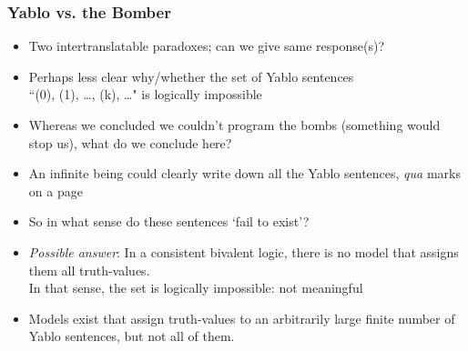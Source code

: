 \begin{frame}
\frametitle{Yablo vs. the Bomber}

\begin{itemize}[<+->]

\item Two intertranslatable paradoxes; can we give same response(s)?

\item Perhaps less clear why/whether the set of Yablo sentences \\ ``(0), (1), \dots, (k), \dots" is logically impossible


\item Whereas we concluded we couldn't program the bombs (something would stop us), what do we conclude here?

\item An infinite being could clearly write down all the Yablo sentences, \textit{qua} marks on a page

\item So in what sense do these sentences `fail to exist'? 


\item \textit{Possible answer}: In a consistent bivalent logic, there is no model that assigns them all truth-values. \\ In that sense, the set is logically impossible: not meaningful

\item Models exist that assign truth-values to an arbitrarily large finite number of Yablo sentences, but not all of them. 




\end{itemize}
\end{frame}

